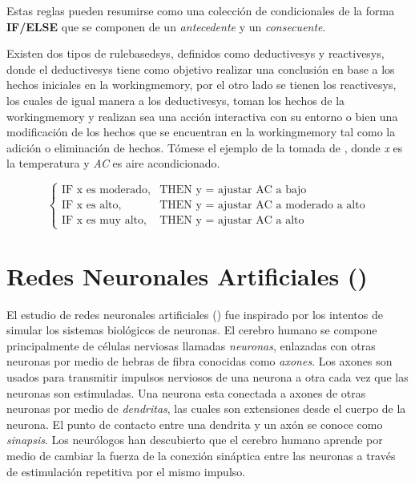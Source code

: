 Estas reglas pueden resumirse como una colección de condicionales de la forma \textbf{IF/ELSE} que se componen de un \emph{antecedente} y un \emph{consecuente}.

Existen dos tipos de \gls{rulebasedsys}, definidos como \gls{deductivesys} y \gls{reactivesys}, donde el \gls{deductivesys} tiene como objetivo realizar una conclusión en base a los hechos iniciales en la \gls{workingmemory}, por el otro lado se tienen los \gls{reactivesys}, los cuales de igual manera a los \gls{deductivesys}, toman los hechos de la \gls{workingmemory} y realizan sea una acción interactiva con su entorno o bien una modificación de los hechos que se encuentran en la \gls{workingmemory} tal como la adición o eliminación de hechos. Tómese el ejemplo de la  tomada de \cite{Mendel}, donde \emph{x} es la temperatura y \emph{AC} es aire acondicionado.

\begin{equation} \label{eq:rbs-example}
  \left\{ \begin{array}{ll}
            \text{IF x es moderado,} & \text{THEN y = ajustar AC a bajo} \\
            \text{IF x es alto,}     & \text{THEN y = ajustar AC a moderado a alto} \\
            \text{IF x es muy alto,} & \text{THEN y = ajustar AC a alto} 
          \end{array} \right.
\end{equation}


\section{Redes Neuronales Artificiales ()} \label{sec:ANN}
El estudio de redes neuronales artificiales () fue inspirado por los intentos de simular los sistemas biológicos de neuronas. El cerebro humano se compone principalmente de células nerviosas llamadas \emph{neuronas}, enlazadas con otras neuronas por medio de hebras de fibra conocidas como \emph{axones}. Los axones son usados para transmitir impulsos nerviosos de una neurona a otra cada vez que las neuronas son estimuladas. Una neurona esta conectada a axones de otras neuronas por medio de \emph{dendritas}, las cuales son extensiones desde el cuerpo de la neurona. El punto de contacto entre una dendrita y un axón se conoce como \emph{sinapsis}. Los neurólogos han descubierto que el cerebro humano aprende por medio de cambiar la fuerza de la conexión sináptica entre las neuronas a través de estimulación repetitiva por el mismo impulso.


